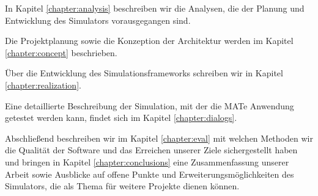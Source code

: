 In Kapitel \ref{chapter:analysis} beschreiben wir die Analysen, die der Planung und Entwicklung des Simulators vorausgegangen sind.

Die Projektplanung sowie die Konzeption der Architektur werden im Kapitel \ref{chapter:concept} beschrieben.

Über die Entwicklung des Simulationsframeworks schreiben wir in Kapitel \ref{chapter:realization}.

Eine detaillierte Beschreibung der Simulation, mit der die MATe Anwendung getestet werden kann, findet sich im Kapitel \ref{chapter:dialogs}.

Abschließend beschreiben wir im Kapitel \ref{chapter:eval} mit welchen Methoden wir die Qualität der Software und das Erreichen unserer Ziele sichergestellt haben und bringen in Kapitel \ref{chapter:conclusions} eine Zusammenfassung unserer Arbeit sowie Ausblicke auf offene Punkte und Erweiterungsmöglichkeiten des Simulators, die als Thema für weitere Projekte dienen können.


